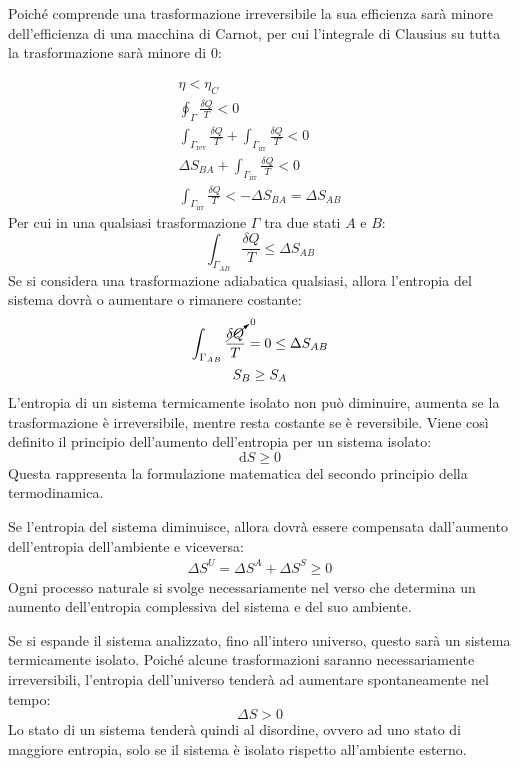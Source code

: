\documentclass{article}
\newcommand{\df}{\mathrm{d}}
\numberwithin{equation}{subsection}
\begin{document}
Poiché comprende una trasformazione irreversibile la sua efficienza sarà minore dell'efficienza di una macchina di Carnot, per cui l'integrale di Clausius su tutta la trasformazione 
sarà minore di $0$:

\begin{gather*}
    \eta<\eta_C\\
    \oint_{\Gamma}\displaystyle\frac{\delta Q}{T}<0\\
    \int_{\Gamma_{\mathrm{rev}}}\displaystyle\frac{\delta Q}{T}+\int_{\Gamma_{\mathrm{irr}}}\frac{\delta Q}{T}<0\\
    \Delta S_{BA}+\displaystyle\int_{\Gamma_{\mathrm{irr}}}\frac{\delta Q}{T}<0\\
    \displaystyle\int_{\Gamma_{\mathrm{irr}}}\frac{\delta Q}{T}<-\Delta S_{BA}=\Delta S_{AB}
\end{gather*}
Per cui in una qualsiasi trasformazione $\Gamma$ tra due stati $A$ e $B$:
\begin{equation*}
    \displaystyle\int_{\Gamma_{AB}}\frac{\delta Q}{T}\leq\Delta S_{AB}
\end{equation*}
Se si considera una trasformazione adiabatica qualsiasi, allora l'entropia del sistema dovrà o aumentare o rimanere costante:
\begin{gather*}
    \displaystyle\int_{\Gamma_{AB}}\frac{\cancelto{0}{\delta Q}}{T}=0\leq\Delta S_{AB}\\
    S_B\geq S_A
\end{gather*}
L'entropia di un sistema termicamente isolato non può diminuire, aumenta se la trasformazione è irreversibile, mentre resta costante se è reversibile. Viene così definito 
il principio dell'aumento dell'entropia per un sistema isolato: 
\begin{equation*}
    \df S\geq0
\end{equation*}
Questa rappresenta la formulazione matematica del secondo principio della termodinamica. 



Se l'entropia del sistema diminuisce, allora dovrà essere compensata dall'aumento dell'entropia dell'ambiente e viceversa:
\begin{gather*}
    \Delta S^U=\Delta  S^A+\Delta S^S\geq0
\end{gather*}
Ogni processo naturale si svolge necessariamente nel verso che determina un aumento dell'entropia complessiva del sistema e del suo ambiente. 



Se si espande il sistema analizzato, fino all'intero universo, questo sarà un sistema termicamente isolato. Poiché alcune trasformazioni saranno necessariamente irreversibili, 
l'entropia dell'universo tenderà ad aumentare spontaneamente nel tempo:
\begin{equation}
    \Delta S>0
\end{equation}
Lo stato di un sistema tenderà quindi al disordine, ovvero ad uno stato di maggiore entropia, solo se il sistema è isolato rispetto all'ambiente esterno. 
\end{document}
